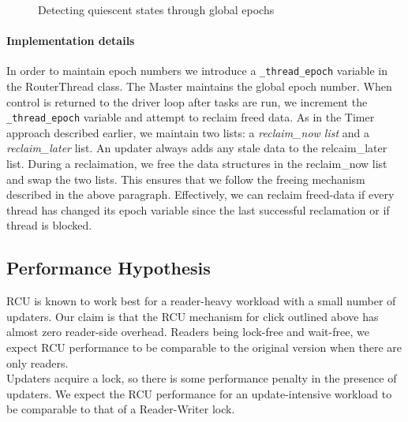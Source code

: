 \documentclass[12pt,a4paper]{article}
\begin{document}
\begin{figure}[tph]
\label{rcufigure}
\caption{Detecting quiescent states through global epochs}
\end{figure}

\paragraph{Implementation details}
In order to maintain epoch numbers we introduce a \verb+_thread_epoch+ variable in the RouterThread class. The Master maintains the global epoch number. When control is returned to the driver loop after tasks are run, we increment the \verb+_thread_epoch+ variable and attempt to reclaim freed data. As in the Timer approach described earlier, we maintain two lists: a \emph{reclaim\_now list} and a \emph{reclaim\_later} list. An updater always adds any stale data to the relcaim\_later list. During a reclaimation, we free the data structures in the reclaim\_now list and swap the two lists. This ensures that we follow the freeing mechanism described in the above paragraph. Effectively, we can reclaim freed-data if every thread has changed its epoch variable since the last successful reclamation or if thread is blocked.
\subsection{Performance Hypothesis}
\label{sec:perfhypothesis}
RCU is known to work best for a reader-heavy workload with a small number of updaters. Our claim is that the RCU mechanism for click outlined above has almost zero reader-side overhead. Readers being lock-free and wait-free, we expect RCU performance to be comparable to the original version when there are only readers.\\

Updaters acquire a lock, so there is some performance penalty in the presence of updaters. We expect the RCU performance for an update-intensive workload to be comparable to that of a Reader-Writer lock.
\end{document}
